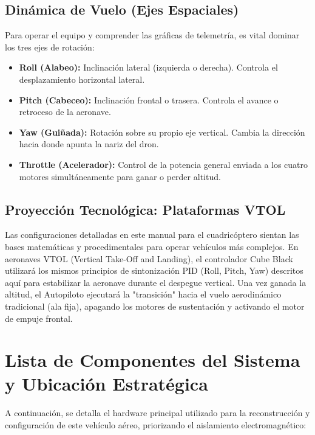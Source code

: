 \documentclass[12pt,a4paper]{article}
\begin{document}
\subsection{Dinámica de Vuelo (Ejes Espaciales)}
Para operar el equipo y comprender las gráficas de telemetría, es vital dominar los tres ejes de rotación:
\begin{itemize}[leftmargin=*]
    \item \textbf{Roll (Alabeo):} Inclinación lateral (izquierda o derecha). Controla el desplazamiento horizontal lateral.
    \item \textbf{Pitch (Cabeceo):} Inclinación frontal o trasera. Controla el avance o retroceso de la aeronave.
    \item \textbf{Yaw (Guiñada):} Rotación sobre su propio eje vertical. Cambia la dirección hacia donde apunta la nariz del dron.
    \item \textbf{Throttle (Acelerador):} Control de la potencia general enviada a los cuatro motores simultáneamente para ganar o perder altitud.
\end{itemize}

\subsection{Proyección Tecnológica: Plataformas VTOL}
Las configuraciones detalladas en este manual para el cuadricóptero sientan las bases matemáticas y procedimentales para operar vehículos más complejos. En aeronaves VTOL (Vertical Take-Off and Landing), el controlador Cube Black utilizará los mismos principios de sintonización PID (Roll, Pitch, Yaw) descritos aquí para estabilizar la aeronave durante el despegue vertical. Una vez ganada la altitud, el Autopiloto ejecutará la "transición" hacia el vuelo aerodinámico tradicional (ala fija), apagando los motores de sustentación y activando el motor de empuje frontal.

\section{Lista de Componentes del Sistema y Ubicación Estratégica}
A continuación, se detalla el hardware principal utilizado para la reconstrucción y configuración de este vehículo aéreo, priorizando el aislamiento electromagnético:
\end{document}
